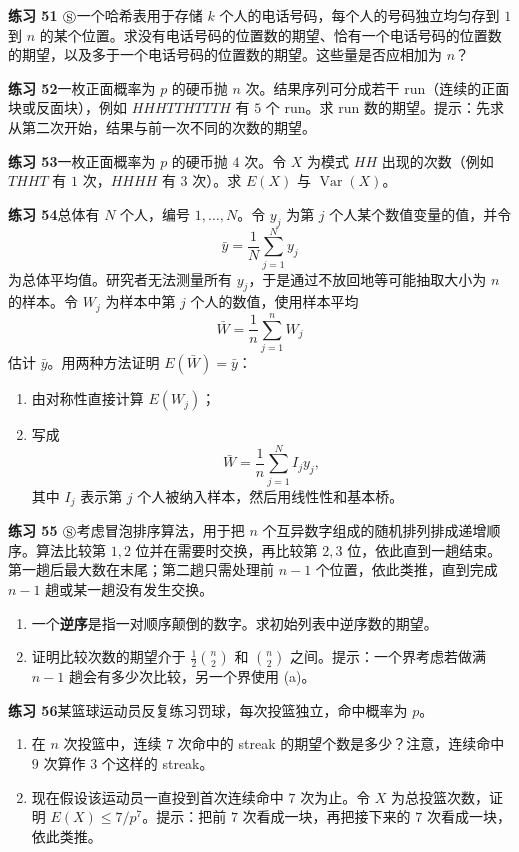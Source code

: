 \documentclass[UTF8, 12pt, fontset=fandol, oneside]{ctexart}
\begin{document}
\noindent\textbf{练习 51 $\circledS$}\quad 一个哈希表用于存储 $k$ 个人的电话号码，每个人的号码独立均匀存到 $1$ 到 $n$ 的某个位置。求没有电话号码的位置数的期望、恰有一个电话号码的位置数的期望，以及多于一个电话号码的位置数的期望。这些量是否应相加为 $n$？

\noindent\textbf{练习 52}\quad 一枚正面概率为 $p$ 的硬币抛 $n$ 次。结果序列可分成若干 run（连续的正面块或反面块），例如 $HHHTTHTTTH$ 有 $5$ 个 run。求 run 数的期望。提示：先求从第二次开始，结果与前一次不同的次数的期望。

\noindent\textbf{练习 53}\quad 一枚正面概率为 $p$ 的硬币抛 $4$ 次。令 $X$ 为模式 $HH$ 出现的次数（例如 $THHT$ 有 $1$ 次，$HHHH$ 有 $3$ 次）。求 $E(X)$ 与 $\operatorname{Var}(X)$。

\noindent\textbf{练习 54}\quad 总体有 $N$ 个人，编号 $1,\ldots,N$。令 $y_j$ 为第 $j$ 个人某个数值变量的值，并令
\[
  \bar{y}=\frac{1}{N}\sum_{j=1}^N y_j
\]
为总体平均值。研究者无法测量所有 $y_j$，于是通过不放回地等可能抽取大小为 $n$ 的样本。令 $W_j$ 为样本中第 $j$ 个人的数值，使用样本平均
\[
  \bar{W}=\frac{1}{n}\sum_{j=1}^n W_j
\]
估计 $\bar{y}$。用两种方法证明 $E(\bar{W})=\bar{y}$：
\begin{enumerate}
  \item[(a)] 由对称性直接计算 $E(W_j)$；
  \item[(b)] 写成
  \[
    \bar{W}=\frac{1}{n}\sum_{j=1}^N I_jy_j,
  \]
  其中 $I_j$ 表示第 $j$ 个人被纳入样本，然后用线性性和基本桥。
\end{enumerate}

\noindent\textbf{练习 55 $\circledS$}\quad 考虑冒泡排序算法，用于把 $n$ 个互异数字组成的随机排列排成递增顺序。算法比较第 $1,2$ 位并在需要时交换，再比较第 $2,3$ 位，依此直到一趟结束。第一趟后最大数在末尾；第二趟只需处理前 $n-1$ 个位置，依此类推，直到完成 $n-1$ 趟或某一趟没有发生交换。
\begin{enumerate}
  \item[(a)] 一个\textbf{逆序}是指一对顺序颠倒的数字。求初始列表中逆序数的期望。
  \item[(b)] 证明比较次数的期望介于 $\frac12\binom{n}{2}$ 和 $\binom{n}{2}$ 之间。提示：一个界考虑若做满 $n-1$ 趟会有多少次比较，另一个界使用 (a)。
\end{enumerate}

\noindent\textbf{练习 56}\quad 某篮球运动员反复练习罚球，每次投篮独立，命中概率为 $p$。
\begin{enumerate}
  \item[(a)] 在 $n$ 次投篮中，连续 $7$ 次命中的 streak 的期望个数是多少？注意，连续命中 $9$ 次算作 $3$ 个这样的 streak。
  \item[(b)] 现在假设该运动员一直投到首次连续命中 $7$ 次为止。令 $X$ 为总投篮次数，证明 $E(X)\le 7/p^7$。提示：把前 $7$ 次看成一块，再把接下来的 $7$ 次看成一块，依此类推。
\end{enumerate}
\end{document}

